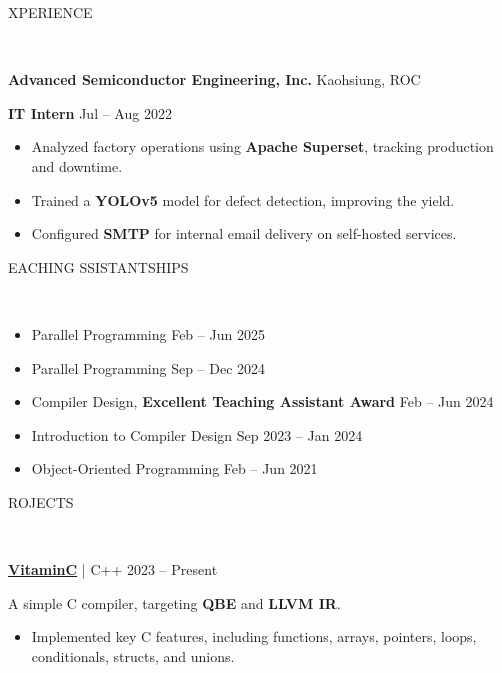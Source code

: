 \documentclass[11pt]{article}
\begin{document}
\begin{center}
    \scalebox{1.3}{E}XPERIENCE\raggedright \,\hrulefill
\end{center}

\textbf{Advanced Semiconductor Engineering, Inc.}   \hfill Kaohsiung, ROC

\textbf{IT Intern} \hfill Jul -- Aug 2022
\begin{itemize}[noitemsep, topsep=0pt, partopsep=0pt, parsep=0pt, leftmargin=*]
    \item Analyzed factory operations using \textbf{Apache Superset}, tracking production and downtime.
    \item Trained a \textbf{YOLOv5} model for defect detection, improving the yield.
    \item Configured \textbf{SMTP} for internal email delivery on self-hosted services.
\end{itemize}

\begin{center}
    \scalebox{1.3}{T}EACHING \scalebox{1.3}{A}SSISTANTSHIPS\raggedright \,\hrulefill
\end{center}

\begin{itemize}[noitemsep, topsep=0pt, partopsep=0pt, parsep=0pt, leftmargin=*]
    \item {}  Parallel Programming \hfill Feb -- Jun 2025
    \item {}  Parallel Programming \hfill Sep -- Dec 2024
    \item {}  Compiler Design, \textbf{Excellent Teaching Assistant Award} \hfill Feb -- Jun 2024
    \item {}  Introduction to Compiler Design \hfill Sep 2023 -- Jan 2024
    \item {}    Object-Oriented Programming \hfill Feb -- Jun 2021
\end{itemize}

\begin{center}
    \scalebox{1.3}{P}ROJECTS\raggedright \,\hrulefill
\end{center}

\textbf{\href{https://github.com/fruits-lab/vitaminc}{VitaminC}} | C++ \hfill 2023 -- Present

A simple C compiler, targeting \textbf{QBE} and \textbf{LLVM IR}.
\begin{itemize}[noitemsep, topsep=0pt, partopsep=0pt, parsep=0pt, leftmargin=*]
    \item Implemented key C features, including functions, arrays, pointers, loops, conditionals, structs, and unions.
\end{itemize}
\end{document}
